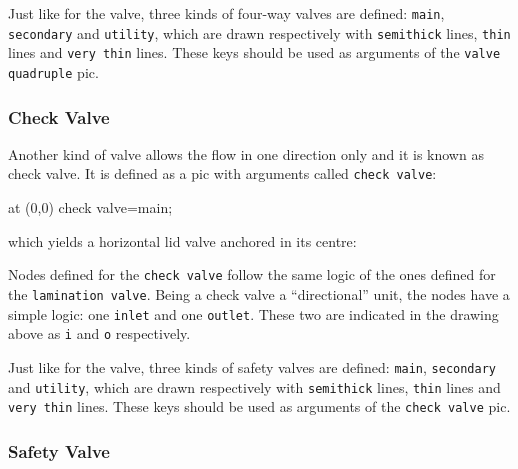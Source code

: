 \documentclass[12pt]{article}						%
\newcommand*{\chpn}[1]{\texttt{#1}}				%
\newcommand*{\chpp}[1]{\texttt{#1}}				%
\newcommand*{\chpa}[1]{\texttt{#1}}				%
\begin{document}
Just like for the valve, three kinds of four-way valves are defined:
\chpa{main}, \chpa{secondary} and \chpa{utility}, which are drawn respectively
with \verb|semithick| lines, \verb|thin| lines and \verb|very thin| lines. These
keys should be used as arguments of the \chpp{valve quadruple} pic.

\subsubsection{Check Valve}

Another kind of valve allows the flow in one direction only and it is known as
check valve. It is defined as a pic with arguments called \chpp{check valve}:
\begin{chpcode}
	\pic at (0,0) {check valve=main};
\end{chpcode}
which yields a horizontal lid valve anchored in its centre:
\begin{center}
\end{center}

Nodes defined for the \chpp{check valve} follow the same logic of the ones
defined for the \chpp{lamination valve}. Being a check valve a ``directional''
unit, the nodes have a simple logic: one \chpn{inlet} and one \chpn{outlet}.
These two are indicated in the drawing above as \chpn{i} and \chpn{o}
respectively.

Just like for the valve, three kinds of safety valves are defined: \chpa{main},
\chpa{secondary} and \chpa{utility}, which are drawn respectively with
\verb|semithick| lines, \verb|thin| lines and \verb|very thin| lines. These keys
should be used as arguments of the \chpp{check valve} pic.

\subsubsection{Safety Valve}
\end{document}
